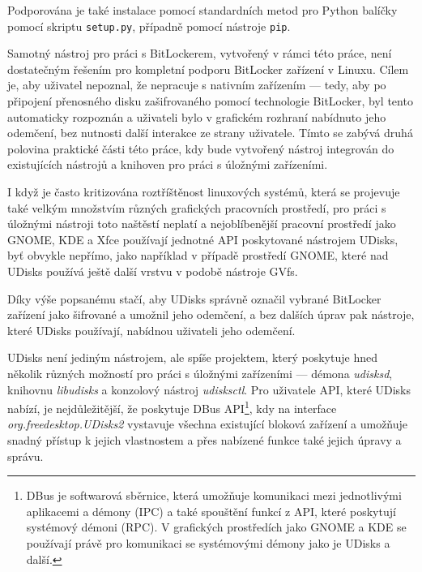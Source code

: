 Podporována je také instalace pomocí standardních metod pro Python balíčky pomocí skriptu \texttt{setup.py}, případně pomocí nástroje \texttt{pip}.

\label{sec:integrace}

Samotný nástroj pro práci s BitLockerem, vytvořený v rámci této práce, není dos\-ta\-teč\-ným řešením pro kompletní podporu BitLocker zařízení v Linuxu. Cílem je, aby uživatel nepoznal, že nepracuje s nativním zařízením --- tedy, aby po připojení přenosného disku zašifrovaného pomocí technologie BitLocker, byl tento automaticky rozpoznán a uživateli bylo v grafickém rozhraní nabídnuto jeho odemčení, bez nutnosti další interakce ze strany uživatele. Tímto se zabývá druhá polovina praktické části této práce, kdy bude vytvořený nástroj integrován do existujících nástrojů a knihoven pro práci s úložnými zařízeními.

\label{sec:udisks}

I když je často kritizována roztříštěnost linuxových systémů, která se projevuje také velkým množstvím různých grafických pracovních prostředí, pro práci s úložnými ná\-stro\-ji toto naštěstí neplatí a nejoblíbenější pracovní prostředí jako GNOME, KDE a Xfce používají jednotné API poskytované nástrojem UDisks, byť obvykle nepřímo, jako například v případě prostředí GNOME, které nad UDisks používá ještě další vrstvu v podobě nástroje GVfs\cite{GVfs2019}.

Díky výše popsanému stačí, aby UDisks správně označil vybrané BitLocker zařízení jako šifrované a umožnil jeho odemčení, a bez dalších úprav pak nástroje, které UDisks používají, nabídnou uživateli jeho odemčení.

UDisks není jediným nástrojem, ale spíše projektem, který poskytuje hned několik různých možností pro práci s úložnými zařízeními --- démona \emph{udisksd}, knihovnu \emph{libudisks} a konzolový nástroj \emph{udisksctl}\cite{UDisks2018}. Pro uživatele API, které UDisks nabízí, je nejdůležitější, že poskytuje DBus API\footnote{DBus je softwarová sběrnice, která umožňuje komunikaci mezi jednotlivými aplikacemi a démony (IPC) a také spouštění funkcí z API, které poskytují systémový démoni (RPC). V grafických prostředích jako GNOME a KDE se používají právě pro komunikaci se systémovými démony jako je UDisks a další.\cite{Palmieri2005}}, kdy na interface \emph{org.freedesktop.UDisks2} vystavuje všechna existující bloková zařízení a umožňuje snadný přístup k jejich vlastnostem a přes nabízené funkce také jejich úpravy a správu.

